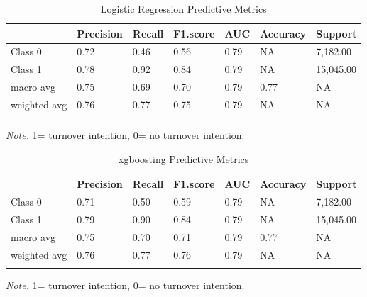 \documentclass[
  man]{apa7}
\begin{document}
\begin{table}[tbp]

\begin{center}
\begin{threeparttable}

\caption{\label{tab:logitable75}Logistic Regression Predictive Metrics}

\begin{tabular}{lllllll}
\toprule
 & \multicolumn{1}{c}{Precision} & \multicolumn{1}{c}{Recall} & \multicolumn{1}{c}{F1.score} & \multicolumn{1}{c}{AUC} & \multicolumn{1}{c}{Accuracy} & \multicolumn{1}{c}{Support}\\
\midrule
Class 0 & 0.72 & 0.46 & 0.56 & 0.79 & NA & 7,182.00\\
Class 1 & 0.78 & 0.92 & 0.84 & 0.79 & NA & 15,045.00\\
macro avg & 0.75 & 0.69 & 0.70 & 0.79 & 0.77 & NA\\
weighted avg & 0.76 & 0.77 & 0.75 & 0.79 & NA & NA\\
\bottomrule
\addlinespace
\end{tabular}

\begin{tablenotes}[para]
\normalsize{\textit{Note.} 1= turnover intention, 0= no turnover intention.}
\end{tablenotes}

\end{threeparttable}
\end{center}

\end{table}

\begin{table}[tbp]

\begin{center}
\begin{threeparttable}

\caption{\label{tab:xgbtable75}xgboosting Predictive Metrics}

\begin{tabular}{lllllll}
\toprule
 & \multicolumn{1}{c}{Precision} & \multicolumn{1}{c}{Recall} & \multicolumn{1}{c}{F1.score} & \multicolumn{1}{c}{AUC} & \multicolumn{1}{c}{Accuracy} & \multicolumn{1}{c}{Support}\\
\midrule
Class 0 & 0.71 & 0.50 & 0.59 & 0.79 & NA & 7,182.00\\
Class 1 & 0.79 & 0.90 & 0.84 & 0.79 & NA & 15,045.00\\
macro avg & 0.75 & 0.70 & 0.71 & 0.79 & 0.77 & NA\\
weighted avg & 0.76 & 0.77 & 0.76 & 0.79 & NA & NA\\
\bottomrule
\addlinespace
\end{tabular}

\begin{tablenotes}[para]
\normalsize{\textit{Note.} 1= turnover intention, 0= no turnover intention.}
\end{tablenotes}

\end{threeparttable}
\end{center}

\end{table}
\end{document}
